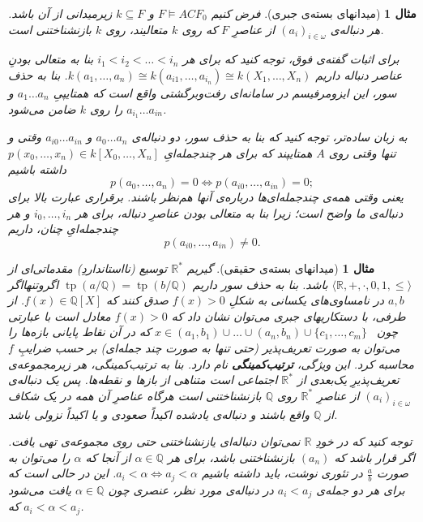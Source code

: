 \documentclass[12pt,a4paper]{report}
\theoremstyle{colorhead}
\newtheorem{mesal}[thm]{مثال}
\DeclareMathOperator{\tp}{tp}
\begin{document}
\begin{mesal}[میدانهای بسته‌ی جبری]
فرض کنیم
$F\models ACF_0$
و 
$k\subseteq F$
زیرمیدانی از
آن باشد. هر دنباله‌ی
$(a_i)_{i\in \omega}$
از عناصرِ
$F$
که روی
$k$
متعالیند، روی
$k$
بازنشناختنی است. 
\par 
برای اثبات گفته‌ی فوق، توجه کنید که برای هر
$i_1<i_2<\ldots<i_n$
بنا به متعالی بودنِ عناصر دنباله داریم
$k(a_1, \ldots,a_n)\cong k(a_{i1},\ldots,a_{i_n})\cong k(X_1,\ldots,X_n)$.
بنا به حذف سور، این ایزومرفیسم در سامانه‌ای رفت‌وبرگشتی واقع است که همتایپیِ
$a_1\ldots a_n$
و
$a_{i_1}\ldots a_{in}$
را روی
$k$
ضامن می‌شود. 
\par 
به زبان ساده‌تر، توجه کنید که بنا به حذف سور، دو دنباله‌ی
$a_0\ldots a_n$
و
$a_{i0}\ldots a_{in}$
وقتی و تنها وقتی روی 
$A$
همتایپند که برای هر چندجمله‌ایِ
$p(x_0,\ldots,x_n)\in k[X_0,\ldots,X_n]$
داشته باشیم
\[
p(a_0,\ldots,a_n)=0 \Leftrightarrow p(a_{i0},\ldots,a_{in})=0;
\]
یعنی وقتی همه‌ی چندجمله‌ای‌ها درباره‌ی آنها هم‌نظر باشند. برقراری عبارت بالا 
برای دنباله‌ی ما
واضح است؛ زیرا بنا به متعالی بودن عناصرِ دنباله، برای هر
$i_0,\ldots,i_n$
و هر چندجمله‌ایِ چنان،
داریم
\[
p(a_{i0},\ldots,a_{in})\neq 0.
\]
\end{mesal}
\begin{mesal}[میدانهای بسته‌ی حقیقی]
گیریم
$\mathbb{R}^*$
توسیع (نااستانداردِ) مقدماتی‌ای از
$\langle\mathbb{R},+,\cdot,0,1,\leq\rangle$
باشد. بنا به حذف سور داریم
$\tp(a/\mathbb{Q})=\tp(b/\mathbb{Q})$
اگروتنهااگر
$a,b$
در نامساوی‌های یکسانی به شکلِ
$f(x)>0$
صدق کنند که
$f(x)\in\mathbb{Q}[X]$.
از طرفی، با دستکاریهای جبری می‌توان نشان داد که 
$f(x)>0$
معادل است با عبارتی چون
\mbox{
$x\in (a_1,b_1)\cup \ldots \cup (a_n,b_n)\cup \{c_1,\ldots,c_m\}$}
که در آن نقاط پایانی بازه‌ها را می‌توان به صورت تعریف‌پذیر
(حتی تنها به صورت چند جمله‌ای) بر حسب ضرایبِ
$f$
محاسبه کرد. این ویژگی، 
\textbf{ترتیب‌کمینگی}
 نام دارد. بنا به ترتیب‌کمینگی، هر زیرمجموعه‌ی
تعریف‌پذیرِ یک‌بعدی از
$\mathbb{R}^*$
اجتماعی است متناهی از باز‌ها و نقطه‌ها. پس یک دنباله‌ی
$(a_i)_{i\in \omega}$
از عناصرِ
$\mathbb{R}^*$
روی
$\mathbb{Q}$
بازنشناختنی است هرگاه عناصرِ آن همه در یک شکاف از
$\mathbb{Q}$
واقع باشند و دنباله‌ی یادشده اکیداً صعودی و یا اکیداً نزولی باشد.
\par 
توجه کنید که در خودِ
$\mathbb{R}$
نمی‌توان دنباله‌ای یازنشناختنی حتی روی مجموعه‌ی
تهی یافت. اگر قرار باشد که
$(a_n)$
بازنشناختنی باشد، برای هر
$\alpha\in \mathbb{Q}$
از آنجا که
$\alpha$
را می‌توان به صورت
$\frac{a}{b}$
در تئوری نوشت، باید داشته باشیم
$a_i<\alpha\Leftrightarrow a_j<\alpha$.
این در حالی است که برای هر دو جمله‌ی
$a_i<a_j$
در دنباله‌ی مورد نظر، عنصری چون
$\alpha\in \mathbb{Q}$
یافت می‌شود که 
$a_i<\alpha<a_j$.
\end{mesal}
\end{document}

